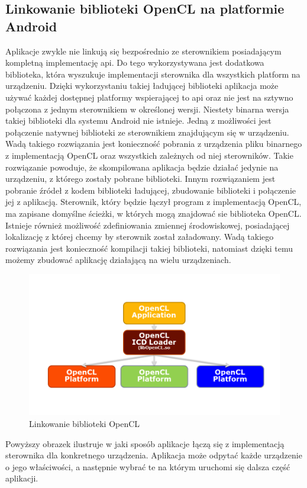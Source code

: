 \subsection{Linkowanie biblioteki OpenCL na platformie Android}
Aplikacje zwykle nie linkują się bezpośrednio ze sterownikiem posiadającym kompletną implementację api. Do tego wykorzystywana jest dodatkowa biblioteka, która wyszukuje implementacji sterownika dla wszystkich platform na urządzeniu. Dzięki wykorzystaniu takiej ładującej biblioteki aplikacja może używać każdej dostępnej platformy wspierającej to api oraz nie jest na sztywno połączona z jednym sterownikiem w określonej wersji.
Niestety binarna wersja takiej biblioteki dla systemu Android nie istnieje. Jedną z możliwości jest połączenie natywnej biblioteki ze sterownikiem znajdującym się w urządzeniu. Wadą takiego rozwiązania jest konieczność pobrania z urządzenia pliku binarnego z implementacją OpenCL oraz wszystkich zależnych od niej sterowników. Takie rozwiązanie powoduje, że skompilowana aplikacja będzie działać jedynie na urządzeniu, z którego zostały pobrane biblioteki.
Innym rozwiązaniem jest pobranie źródeł z kodem biblioteki ładującej, zbudowanie biblioteki i połączenie jej z aplikacją. Sterownik, który będzie łączył program z implementacją OpenCL, ma zapisane domyślne ścieżki, w których mogą znajdować sie biblioteka OpenCL. Istnieje również możliwość zdefiniowania zmiennej środowiskowej, posiadającej lokalizację z której chcemy by sterownik został załadowany. Wadą takiego rozwiązania jest konieczność kompilacji takiej biblioteki, natomiast dzięki temu możemy zbudować aplikację działającą na wielu urządzeniach.
\begin{figure}[H]
	\includegraphics[scale=0.4]{imgs/icdLoader.png}
	\caption{Linkowanie biblioteki OpenCL \cite{Loader}}
\end{figure}
Powyższy obrazek ilustruje w jaki sposób aplikacje łączą się z implementacją sterownika dla konkretnego urządzenia. Aplikacja może odpytać każde urządzenie o jego właściwości, a następnie wybrać te na którym uruchomi się dalsza część aplikacji.

